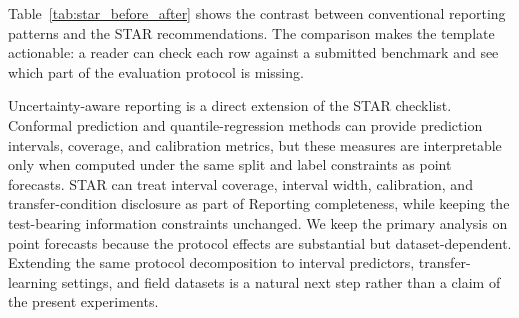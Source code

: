 \documentclass[pdflatex,sn-basic,NameDate]{sn-jnl}
\begin{document}
\begin{table}[t]
\centering
\caption{STAR reporting structure recommended for deployment-relevant cross-bearing evaluation.}
\label{tab:star}
\small
{}
\end{table}

Table~\ref{tab:star_before_after} shows the contrast between conventional reporting patterns and the STAR recommendations. The comparison makes the template actionable: a reader can check each row against a submitted benchmark and see which part of the evaluation protocol is missing.

Uncertainty-aware reporting is a direct extension of the STAR checklist. Conformal prediction and quantile-regression methods \citep{mst2024cqr,icsrs2023splitconformal,phme2026conformal,eaai2025explainable} can provide prediction intervals, coverage, and calibration metrics, but these measures are interpretable only when computed under the same split and label constraints as point forecasts. STAR can treat interval coverage, interval width, calibration, and transfer-condition disclosure as part of Reporting completeness, while keeping the test-bearing information constraints unchanged. We keep the primary analysis on point forecasts because the protocol effects are substantial but dataset-dependent. Extending the same protocol decomposition to interval predictors, transfer-learning settings, and field datasets is a natural next step rather than a claim of the present experiments.
\end{document}
